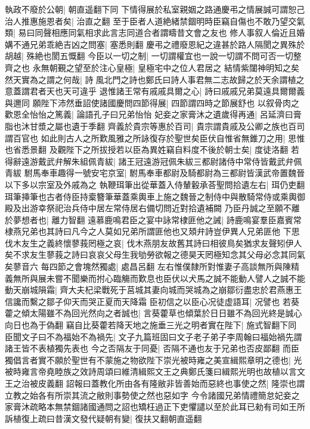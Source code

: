 執政不廢於公朝|{
	朝直遥翻下同}
下情得展於私室親姻之路通慶弔之情展誠可謂恕己治人推惠施恩者矣|{
	治直之翻}
至于臣者人道絶緒禁錮明時臣竊自傷也不敢乃望交氣類|{
	易曰同聲相應同氣相求此言志同道合者謂疇昔文會之友也}
修人事叙人倫近且婚媾不通兄弟乖絶吉凶之問塞|{
	塞悉則翻}
慶弔之禮廢恩紀之違甚於路人隔閡之異殊於胡越|{
	殊絶也閡五慨翻}
今臣以一切之制|{
	一切謂權宜也一說一切謂不問可否一切整齊之也}
永無朝覲之望至於注心皇極|{
	皇極宅中之位人君居之}
結情紫闥神明知之矣然天實為之謂之何哉|{
	詩風北門之詩也鄭氏曰詩人事君無二志故歸之於天余謂植之意蓋謂君者天也天可違乎}
退惟諸王常有戚戚具爾之心|{
	詩曰戚戚兄弟莫遠具爾爾義與邇同}
願陛下沛然垂詔使諸國慶問四節得展|{
	四節謂四時之節展舒也}
以叙骨肉之歡恩全怡怡之篤義|{
	論語孔子曰兄弟怡怡}
妃妾之家膏沐之遺歲得再通|{
	呂延濟曰膏脂也沐甘漿之屬也遺于季翻}
齊義於貴宗等惠於百司|{
	貴宗謂貴戚及公卿之族也百司謂百官也}
如此則古人之所歎風雅之所詠復存於聖世矣臣伏自惟省無錐刀之用|{
	思惟也省悉景翻}
及觀陛下之所拔授若以臣為異姓竊自料度不後於朝士矣|{
	度徒洛翻}
若得辭遠游戴武弁解朱組佩青紱|{
	諸王冠遠游冠佩朱紱三都尉諸侍中常侍皆戴武弁佩青紱}
駙馬奉車趣得一號安宅京室|{
	駙馬奉車都尉及騎都尉為三都尉皆漢武帝置魏晉以下多以宗室及外戚為之}
執鞭珥筆出從華蓋入侍輦轂承荅聖問拾遺左右|{
	珥仍吏翻珥筆挿筆也古者侍臣持槖簪筆華蓋乘輿車上施之魏晉之制侍中與散騎常侍或乘輿御殿及出游幸祭祀治兵侍中居左常侍居右備切問近對拾遺補闕}
乃臣丹誠之至願不離於夢想者也|{
	離力智翻}
遠慕鹿鳴君臣之宴中詠常棣匪他之誡|{
	詩鹿鳴宴羣臣嘉賓常棣燕兄弟也其詩曰凡今之人莫如兄弟所謂匪他也又頍弁詩豈伊異人兄弟匪他}
下思伐木友生之義終懷蓼莪罔極之哀|{
	伐木燕朋友故舊其詩曰相彼鳥矣猶求友聲矧伊人矣不求友生蓼莪之詩曰哀哀父母生我劬勞欲報之德昊天罔極知念其父母必念其同氣矣蓼音六}
每四節之會塊然獨處|{
	處昌呂翻}
左右惟僕隸所對惟妻子高談無所與陳精義無所與展未嘗不聞樂而拊心臨觴而歎息也臣伏以犬馬之誠不能動人譬人之誠不能動天崩城隕霜|{
	齊大夫杞梁戰死于莒城其妻向城而哭城為之崩鄒衍盡忠於君燕惠王信讒而繫之鄒子仰天而哭正夏而天降霜}
臣初信之以臣心况徒虚語耳|{
	况譬也}
若葵藿之傾太陽雖不為回光然向之者誠也|{
	言葵藿草也傾葉於日日雖不為回光終是誠心向日也為于偽翻}
竊自比葵藿若降天地之施垂三光之明者實在陛下|{
	施式智翻下同}
臣聞文子曰不為福始不為禍先|{
	文子九篇班固曰文子老子弟子李周翰曰福始禍先謂諸王皆不表植獨先表也}
今之否隔友于同憂|{
	否隔不通也友于兄弟也否皮鄙翻}
而臣獨倡言者實不願於聖世有不蒙施之物欲陛下崇光被時雍之美宣緝熙章明之德也|{
	光被時雍言帝堯睦族之效詩周頌曰維清緝熙文王之典鄭氏箋曰緝熙光明也故植以言文王之治被皮義翻}
詔報曰蓋教化所由各有隆敝非皆善始而惡終也事使之然|{
	隆崇也謂立教之始各有所崇其流之敝則事勢使之然也惡如字}
今令諸國兄弟情禮簡怠妃妾之家膏沐疏略本無禁錮諸國通問之詔也矯枉過正下吏懼譴以至於此耳已勑有司如王所訴植復上疏曰昔漢文發代疑朝有變|{
	復扶又翻朝直遥翻}
